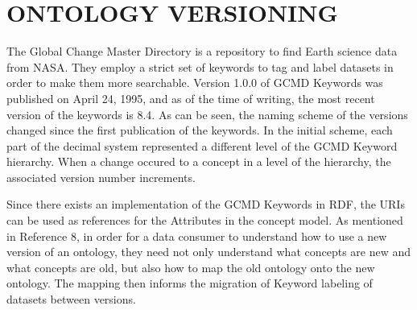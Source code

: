 
\chapter{ONTOLOGY VERSIONING}

The Global Change Master Directory is a repository to find Earth science data from NASA.  They employ a strict set of keywords to tag and label datasets in order to make them more searchable.  Version 1.0.0 of GCMD Keywords was published on April 24, 1995, and as of the time of writing, the most recent version of the keywords is 8.4.  As can be seen, the naming scheme of the versions changed since the first publication of the keywords.  In the initial scheme, each part of the decimal system represented a different level of the GCMD Keyword hierarchy.  When a change occured to a concept in a level of the hierarchy, the associated version number increments.

Since there exists an implementation of the GCMD Keywords in RDF, the URIs can be used as references for the Attributes in the concept model.  As mentioned in Reference 8, in order for a data consumer to understand how to use a new version of an ontology, they need not only understand what concepts are new and what concepts are old, but also how to map the old ontology onto the new ontology.  The mapping then informs the migration of Keyword labeling of datasets between versions.